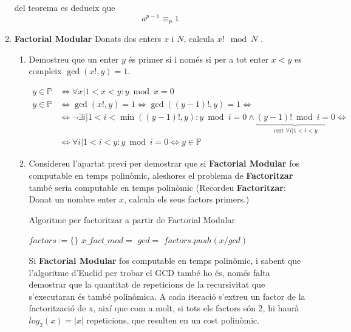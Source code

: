 \documentclass[a4paper]{article}
\def\und#1{\underbrace{#1}}
\begin{document}
\begin{enumerate}
del teorema es dedueix que
$$
a^{p - 1} \equiv_{p} 1
$$

\item \textbf{Factorial Modular} Donats dos enters $x$ i $N$, calcula $x! \mod N$ .
\begin{enumerate}
	\item Demostreu que un enter $y$ és primer si i només si per a tot enter $x < y$ es compleix $\gcd(x!, y) = 1$.
	
	\begin{align*}
		y \in \mathbb{P} &\iff \forall x | 1 < x < y : y \bmod{x} = 0 \\
		y \in \mathbb{P} &\iff \gcd(x!, y) = 1 \iff \gcd((y-1)!, y) = 1 \iff \\
		&\iff \lnot\exists i | 1 < i < \min((y-1)!, y) : y \bmod{i} = 0 \land \und{(y-1)! \bmod{i} = 0}_{\text{cert } \forall i | 1 < i < y} \iff \\
		& \iff \forall i | 1 < i < y : y \bmod{i} = 0 \iff y \in \mathbb{P}
	\end{align*}
	
	\item Considereu l'apartat previ per demostrar que si \textbf{Factorial Modular} fos computable en temps polinòmic, aleshores el problema de \textbf{Factoritzar} també seria computable en temps polinòmic (Recordeu \textbf{Factoritzar}: Donat un nombre enter $x$, calcula els seus factors primers.)
	
	\begin{algorithm}[H]
		\caption{Algoritme per factoritzar a partir de Factorial Modular}
		\begin{algorithmic}[1]	
			\State $factors := \{\}$	
			\State $x\_fact\_mod = $ 
			\State $gcd = $ 
			\State $factors.push (x / gcd)$
			\State {}
			\EndIf
			\State \Return
			\EndFunction		
		\end{algorithmic}
	\end{algorithm}
	
	Si \textbf{Factorial Modular} fos computable en temps polinòmic, i sabent que l'algoritme d'Euclid per trobar el GCD també ho és, només falta demostrar que la quantitat de repeticions de la recursivitat que s'executaran és també polinòmica. A cada iteració s'extreu un factor de la factorització de x, així que com a molt, si tots els factors són 2, hi haurà $log_2(x) = |x|$ repeticions, que resulten en un cost polinòmic.
	

\end{enumerate}
\end{enumerate}
\end{document}

